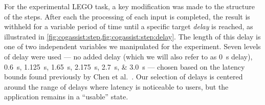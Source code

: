 \documentclass[10pt,letterpaper]{article}
\providecommand{\DIFaddtex}[1]{#1} %
\providecommand{\DIFdeltex}[1]{} %
\providecommand{\DIFaddbegin}{\protect\color{blue}} %
\providecommand{\DIFaddend}{\protect\color{black}} %
\providecommand{\DIFdelbegin}{\protect\color{red}} %
\providecommand{\DIFdelend}{\protect\color{black}} %
\providecommand{\DIFadd}[1]{\texorpdfstring{\DIFaddtex{#1}}{#1}} %
\providecommand{\DIFdel}[1]{\texorpdfstring{\DIFdeltex{#1}}{}} %
\newcommand{\DIFscaledelfig}{0.5}
\newlength{\DIFdelgraphicswidth} %
\newlength{\DIFdelgraphicsheight} %
\newcommand{\DIFaddincludegraphics}[2][]{{\color{blue}\fbox{\DIFOincludegraphics[#1]{#2}}}} %
\newcommand{\DIFdelincludegraphics}[2][]{%
\sbox{\DIFdelgraphicsbox}{\DIFOincludegraphics[#1]{#2}}%
\settoboxwidth{\DIFdelgraphicswidth}{\DIFdelgraphicsbox} %
\settoboxtotalheight{\DIFdelgraphicsheight}{\DIFdelgraphicsbox} %
\scalebox{\DIFscaledelfig}{%
\parbox[b]{\DIFdelgraphicswidth}{\usebox{\DIFdelgraphicsbox}\\[-\baselineskip] \rule{\DIFdelgraphicswidth}{0em}}\llap{\resizebox{\DIFdelgraphicswidth}{\DIFdelgraphicsheight}{%
\setlength{\unitlength}{\DIFdelgraphicswidth}%
\begin{picture}(1,1)%
\thicklines\linethickness{2pt} %
{\color[rgb]{1,0,0}\put(0,0){\framebox(1,1){}}}%
{\color[rgb]{1,0,0}\put(0,0){\line( 1,1){1}}}%
{\color[rgb]{1,0,0}\put(0,1){\line(1,-1){1}}}%
\end{picture}%
}\hspace*{3pt}}} %
} %
\DeclareRobustCommand{\DIFaddbegin}{\DIFOaddbegin \let\includegraphics\DIFaddincludegraphics} %
\DeclareRobustCommand{\DIFaddend}{\DIFOaddend \let\includegraphics\DIFOincludegraphics} %
\DeclareRobustCommand{\DIFdelbegin}{\DIFOdelbegin \let\includegraphics\DIFdelincludegraphics} %
\DeclareRobustCommand{\DIFdelend}{\DIFOaddend \let\includegraphics\DIFOincludegraphics} %
\begin{document}
For the experimental LEGO task, a key modification was made to the structure of the steps.
After each the processing of each input \DIFdelbegin \DIFdel{frame }\DIFdelend is completed, the result is withheld for a variable period of time until a specific target \emph{delay} is reached, as illustrated in \DIFdelbegin \DIFdel{figure \cref{fig:cogassist:step:delay}}\DIFdelend \DIFaddbegin \DIFadd{\cref{fig:cogassist:step,fig:cogassist:step:delay}}\DIFaddend .
The length of this delay is one of two independent variables we manipulated for the experiment.
Seven levels of delay were used --- no added delay (which we will also refer to as \SI{0}{\second} delay), \SIlist{0.6;1.125;1.65;2.175;2.7;3.0}{\second} --- chosen based on the latency bounds found previously by Chen et al.~\cite{Chen:AnEmpiricalStudyOfLatency}.
\DIFdelbegin \DIFdel{A value of  \SI{600}{\milli\second} was identified as the bound where users start noticing delays in the assistant.
Conversely, \SI{2.7}{\second} was identified as the upper bound on delays after which the application is considered to be in such a degraded state it is basically ``unusable''.
Thus, our }\DIFdelend %
\DIFaddbegin \DIFadd{Our }\DIFaddend selection of delays is centered around the range of delays where latency is noticeable to users, but the application remains in a ``usable'' state\DIFdelbegin \DIFdel{, while including one delay value in the unnoticeable range and one completely in the ``unusable'' range.
}\DIFdelend \DIFaddbegin \DIFadd{.
}\DIFaddend 
\end{document}
